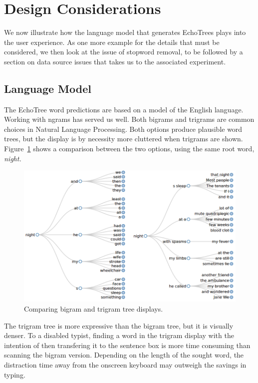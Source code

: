 \documentclass{sigchi}
\begin{document}
\section{Design Considerations}

We now illustrate how the language model that generates EchoTrees
plays into the user experience. As one more example for the details
that must be considered, we then look at the issue of stopword
removal, to be followed by a section on data source issues that
takes us to the associated experiment.

\subsection{Language Model}
The EchoTree word predictions are based on a model of the English
language. Working with ngrams has served us well. Both bigrams and
trigrams are common choices in Natural Language Processing. Both
options produce plausible word trees, but the display is by necessity
more cluttered when trigrams are shown. Figure~\ref{fig:biTrigrams}
shows a comparison between the two options, using the same root word,
{\em night.}
\begin{figure}
   \centering
   \includegraphics[width=\columnwidth]{Figs/biAndTrigrams.png}
   \caption{Comparing bigram and trigram tree displays.}
   \label{fig:biTrigrams}
\end{figure}
The trigram tree is more expressive than the bigram tree, but it is
visually denser. To a disabled typist, finding a word in the trigram
display with the intention of then transfering it to the sentence box
is more time consuming than scanning the bigram version. Depending on
the length of the sought word, the distraction time away from the
onscreen keyboard may outweigh the savings in typing.
\end{document}
